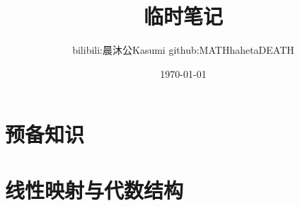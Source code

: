 \documentclass{plainbook}
\title{临时笔记}
\author{bilibili:晨沐公Kasumi \quad github:MATHhahetaDEATH}
\date{\today}
\begin{document}
\frontmatter



\maketitle\pagebreak

% 





% 

% 

\tableofcontents

\mainmatter


\part{预备知识}







\part{线性映射与代数结构}












\end{document}
